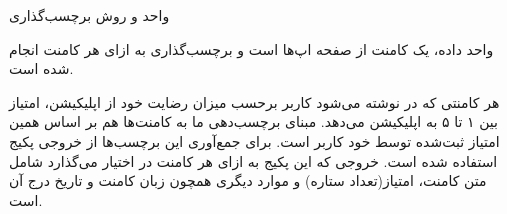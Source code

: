 \Section
{واحد و روش برچسب‌گذاری}
{
واحد داده، یک کامنت از صفحه اپ‌ها است و برچسب‌گذاری به ازای هر کامنت انجام شده است.

هر کامنتی که در 
نوشته می‌شود کاربر برحسب میزان رضایت خود از اپلیکیشن، امتیاز بین ۱ تا ۵ به اپلیکیشن می‌دهد. مبنای برچسب‌دهی ما به کامنت‌ها هم بر اساس همین امتیاز ثبت‌شده توسط خود کاربر است. برای جمع‌آوری این برچسب‌ها از خروجی پکیج  استفاده شده است. خروجی که این پکیج به ازای هر کامنت در اختیار می‌گذارد شامل متن کامنت، امتیاز(تعداد ستاره) و موارد دیگری همچون زبان کامنت و تاریخ درج آن است.
}